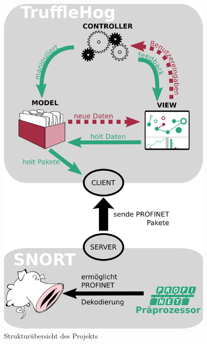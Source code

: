 \begin{figure}[h]
  \centering
  \includegraphics[width=300pt]{../diagrams/intro_diagram/intro_diagram.png}
  \caption[Strukturübersicht des Projekts]{Strukturübersicht des Projekts}\label{fig:diagram}
\end{figure}